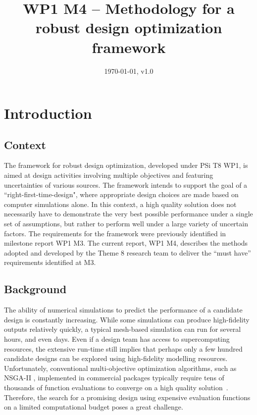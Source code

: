 \documentclass[a4paper]{article}
\begin{document}
\title{WP1 M4 -- Methodology for a robust design optimization framework}
\date{\today, v1.0}
\maketitle

\setcounter{tocdepth}{3}
\tableofcontents

\section{Introduction}
\subsection{Context}
The framework for robust design optimization, developed under PSi T8 WP1, is aimed at design activities involving multiple objectives and featuring uncertainties of various sources. The framework intends to support the goal of a ``right-first-time-design", where appropriate design choices are made based on computer simulations alone. In this context, a high quality solution does not necessarily have to demonstrate the very best possible performance under a single set of assumptions, but rather to perform well under a large variety of uncertain factors. The requirements for the framework were previously identified in milestone report WP1 M3. The current report, WP1 M4, describes the methods adopted and developed by the Theme 8 research team to deliver the ``must have'' requirements identified at M3.

\subsection{Background}
The ability of numerical simulations to predict the performance of a candidate design is constantly increasing. While some simulations can produce high-fidelity outputs relatively quickly, a typical mesh-based simulation can run for several hours, and even days. Even if a design team has access to supercomputing resources, the extensive run-time still implies that perhaps only a few hundred candidate designs can be explored using high-fidelity modelling resources. Unfortunately, conventional multi-objective optimization algorithms, such as NSGA-II \cite{deb2002fast}, implemented in commercial packages typically require tens of thousands of function evaluations to converge on a high quality solution~\cite{Hansen2010Comparing,Zhou2011Multiobjective}. Therefore, the search for a promising design using expensive evaluation functions on a limited computational budget poses a great challenge.
\end{document}
